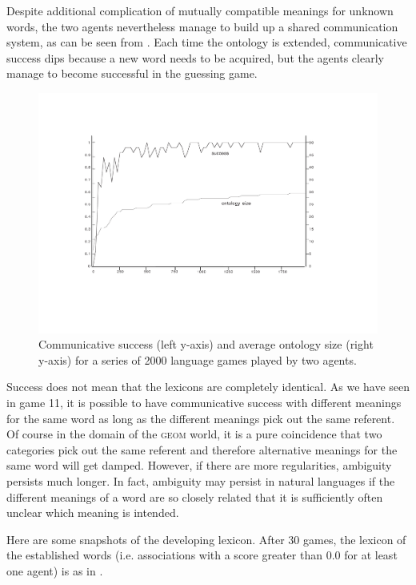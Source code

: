 Despite  additional complication of mutually 
compatible meanings for unknown words, the two agents
nevertheless manage to 
build up a shared communication system, as can be seen 
from . Each time the ontology is 
extended, communicative success dips because a new 
word needs to be acquired, but the agents clearly 
manage to become successful in the guessing game. 



\begin{figure}[htbp]
  \centerline{\includegraphics[width=\textwidth]{chap6/figs/gsucc3.pdf}}
\caption{\label{gsucc3}Communicative 
success (left y-axis) and average ontology size 
(right y-axis) for a series of 2000
language games played by two agents.} 
\end{figure}
Success does not mean that the lexicons are completely 
identical. As we have seen in game 11, it is possible
to have communicative success with different 
meanings for the same word as long as the different meanings
pick out the same referent. Of course in the domain of
the \textsc{geom} world, it is a pure coincidence that two categories
pick out the same referent and therefore alternative 
meanings for the same word will get damped. However, if there
are more regularities, ambiguity persists much longer. 
In fact, ambiguity may persist in natural languages if 
the different meanings of a word are so 
closely related that it is sufficiently often unclear
which meaning is intended. 

Here are some snapshots of the developing lexicon. 
After 30 games, the lexicon of the established
words (i.e. associations with a score greater 
than 0.0 for at least one agent) is as in . 



